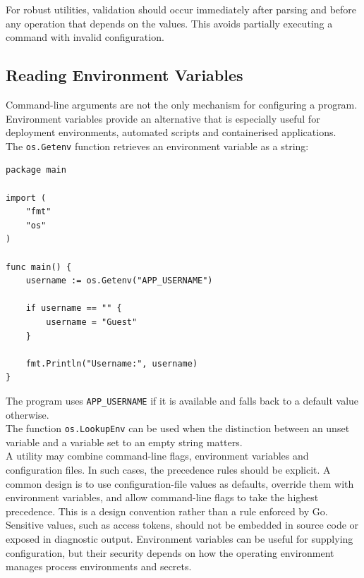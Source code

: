 For robust utilities, validation should occur immediately after parsing and before any operation that depends on the values. This avoids partially executing a command with invalid configuration.\\

\subsection{Reading Environment Variables}

Command-line arguments are not the only mechanism for configuring a program. Environment variables provide an alternative that is especially useful for deployment environments, automated scripts and containerised applications.\\

The \texttt{os.Getenv} function retrieves an environment variable as a string:

\begin{lstlisting}
package main

import (
    "fmt"
    "os"
)

func main() {
    username := os.Getenv("APP_USERNAME")

    if username == "" {
        username = "Guest"
    }

    fmt.Println("Username:", username)
}
\end{lstlisting}

The program uses \texttt{APP_USERNAME} if it is available and falls back to a default value otherwise.\\

The function \texttt{os.LookupEnv} can be used when the distinction between an unset variable and a variable set to an empty string matters.\\

A utility may combine command-line flags, environment variables and configuration files. In such cases, the precedence rules should be explicit. A common design is to use configuration-file values as defaults, override them with environment variables, and allow command-line flags to take the highest precedence. This is a design convention rather than a rule enforced by Go.\\

Sensitive values, such as access tokens, should not be embedded in source code or exposed in diagnostic output. Environment variables can be useful for supplying configuration, but their security depends on how the operating environment manages process environments and secrets.\\

